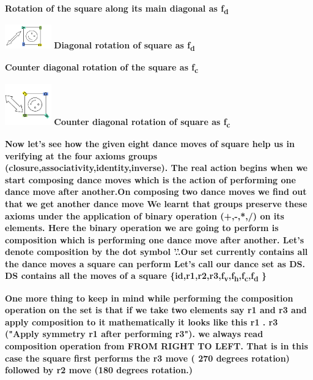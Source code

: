 \documentclass{article}
\begin{document}
\textbf{Rotation of the square along its main diagonal as f\textsubscript{d}}
\begin{center}
    \includegraphics[scale = 0.9, width = 2cm] {images/diagonal.png}
    \center\textbf{Diagonal rotation of square as f\textsubscript{d}}
\end{center}

\textbf{Counter diagonal rotation of the square as f\textsubscript{c}}
\begin{center}
    \includegraphics[scale = 0.9, width = 2cm] {images/counter_diagonal.png}
    \center\textbf{Counter diagonal rotation of square as f\textsubscript{c}}
\end{center}
\pagebreak
\textbf{Now let's see how the given eight dance moves of square help us in verifying at the four axioms groups (closure,associativity,identity,inverse). The real action begins when we start composing dance moves which is the action of performing one dance move after another.On composing two dance moves we find out that we get another dance move
    We learnt that groups preserve these axioms under the application of binary operation (+,-,*,/) on its elements. Here the binary operation we are going to perform is composition which is performing one dance move after another. Let's denote composition by the dot symbol '.'.Our set currently contains all the dance moves a square can perform
    Let's call our dance set as DS. DS contains all the moves of a square \{id,r1,r2,r3,f\textsubscript{v},f\textsubscript{h},f\textsubscript{c},f\textsubscript{d} \}}

\textbf{ One more thing to keep in mind while performing the composition operation on the set is that if we take two elements say r1 and r3 and apply composition to it mathematically it looks like this
    r1 . r3 ("Apply symmetry r1 after performing r3"). we always read composition operation from  FROM RIGHT TO LEFT. That is in this case the square first performs the r3 move ( 270 degrees rotation)  followed by  r2 move (180 degrees rotation.)}
\end{document}
